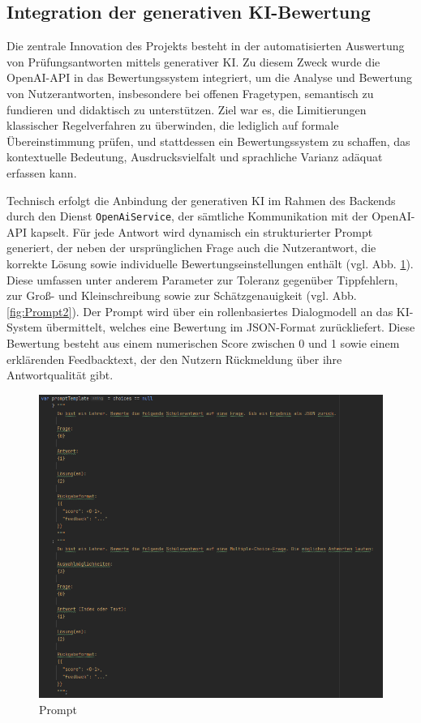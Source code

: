 \documentclass[a4paper,12pt]{article}
\begin{document}
\subsection{Integration der generativen KI-Bewertung}
Die zentrale Innovation des Projekts besteht in der automatisierten Auswertung von Prüfungsantworten mittels generativer KI. Zu diesem Zweck wurde die OpenAI-API in das Bewertungssystem integriert, um die Analyse und Bewertung von Nutzerantworten, insbesondere bei offenen Fragetypen, semantisch zu fundieren und didaktisch zu unterstützen. Ziel war es, die Limitierungen klassischer Regelverfahren zu überwinden, die lediglich auf formale Übereinstimmung prüfen, und stattdessen ein Bewertungssystem zu schaffen, das kontextuelle Bedeutung, Ausdrucksvielfalt und sprachliche Varianz adäquat erfassen kann.

Technisch erfolgt die Anbindung der generativen KI im Rahmen des Backends durch den Dienst \texttt{OpenAiService}, der sämtliche Kommunikation mit der OpenAI-API kapselt. Für jede Antwort wird dynamisch ein strukturierter Prompt generiert, der neben der ursprünglichen Frage auch die Nutzerantwort, die korrekte Lösung sowie individuelle Bewertungseinstellungen enthält (vgl. Abb. \ref{fig:Prompt}). Diese umfassen unter anderem Parameter zur Toleranz gegenüber Tippfehlern, zur Groß- und Kleinschreibung sowie zur Schätzgenauigkeit (vgl. Abb. \ref{fig:Prompt2}). Der Prompt wird über ein rollenbasiertes Dialogmodell an das KI-System übermittelt, welches eine Bewertung im JSON-Format zurückliefert. Diese Bewertung besteht aus einem numerischen Score zwischen 0 und 1 sowie einem erklärenden Feedbacktext, der den Nutzern Rückmeldung über ihre Antwortqualität gibt.

\begin{figure}[H]
    \centering
    \includegraphics[width=1\textwidth]{Bilder/Prompt.png}
    \caption{Prompt}
    \label{fig:Prompt}
\end{figure}
\end{document}
